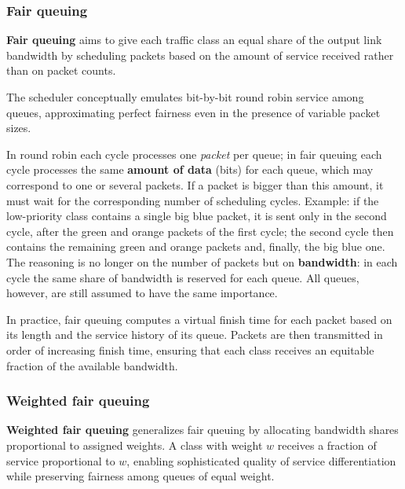\subsubsection*{Fair queuing}

\textbf{Fair queuing} aims to give each traffic class an equal share of the output link bandwidth by scheduling packets based on the amount of service received rather than on packet counts. 

\begin{center}
\end{center}


The scheduler conceptually emulates bit-by-bit round robin service among queues, approximating perfect fairness even in the presence of variable packet sizes.

In round robin each cycle processes one \emph{packet} per queue; in fair queuing each cycle processes the same \textbf{amount of data} (bits) for each queue, which may correspond to one or several packets. If a packet is bigger than this amount, it must wait for the corresponding number of scheduling cycles. Example: if the low-priority class contains a single big blue packet, it is sent only in the second cycle, after the green and orange packets of the first cycle; the second cycle then contains the remaining green and orange packets and, finally, the big blue one. The reasoning is no longer on the number of packets but on \textbf{bandwidth}: in each cycle the same share of bandwidth is reserved for each queue. All queues, however, are still assumed to have the same importance.


In practice, fair queuing computes a virtual finish time for each packet based on its length and the service history of its queue. Packets are then transmitted in order of increasing finish time, ensuring that each class receives an equitable fraction of the available bandwidth.

\subsubsection*{Weighted fair queuing}

\textbf{Weighted fair queuing} generalizes fair queuing by allocating bandwidth shares proportional to assigned weights. A class with weight $w$ receives a fraction of service proportional to $w$, enabling sophisticated quality of service differentiation while preserving fairness among queues of equal weight.

